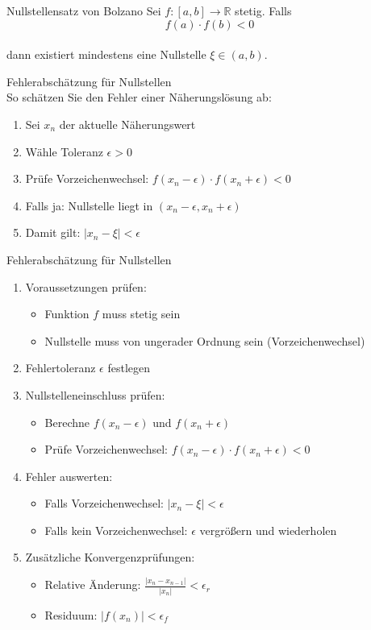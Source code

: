 \begin{lemma}{Nullstellensatz von Bolzano}
Sei $f:[a,b] \rightarrow \mathbb{R}$ stetig. Falls 
\vspace{-1mm}\\
$$f(a) \cdot f(b) < 0$$ 
\vspace{-3mm}\\
dann existiert mindestens eine Nullstelle $\xi \in (a,b)$.
\end{lemma}

\begin{KR}{Fehlerabschätzung für Nullstellen}\\
So schätzen Sie den Fehler einer Näherungslösung ab:
\begin{enumerate}
    \item Sei $x_n$ der aktuelle Näherungswert
    \item Wähle Toleranz $\epsilon > 0$
    \item Prüfe Vorzeichenwechsel: $f(x_n-\epsilon) \cdot f(x_n+\epsilon) < 0$
    \item Falls ja: Nullstelle liegt in $(x_n-\epsilon, x_n+\epsilon)$
    \item Damit gilt: $|x_n-\xi| < \epsilon$
\end{enumerate}
\end{KR}

\begin{KR}{Fehlerabschätzung für Nullstellen}
\begin{enumerate}
    \item Voraussetzungen prüfen:
    \begin{itemize}
        \item Funktion $f$ muss stetig sein
        \item Nullstelle muss von ungerader Ordnung sein (Vorzeichenwechsel)
    \end{itemize}
    \item Fehlertoleranz $\epsilon$ festlegen
    \item Nullstelleneinschluss prüfen:
    \begin{itemize}
        \item Berechne $f(x_n-\epsilon)$ und $f(x_n+\epsilon)$
        \item Prüfe Vorzeichenwechsel: $f(x_n-\epsilon) \cdot f(x_n+\epsilon) < 0$
    \end{itemize}
    \item Fehler auswerten:
    \begin{itemize}
        \item Falls Vorzeichenwechsel: $|x_n-\xi| < \epsilon$
        \item Falls kein Vorzeichenwechsel: $\epsilon$ vergrößern und wiederholen
    \end{itemize}
    \item Zusätzliche Konvergenzprüfungen:
    \begin{itemize}
        \item Relative Änderung: $\frac{|x_n-x_{n-1}|}{|x_n|} < \epsilon_r$
        \item Residuum: $|f(x_n)| < \epsilon_f$
    \end{itemize}
\end{enumerate}
\end{KR}

